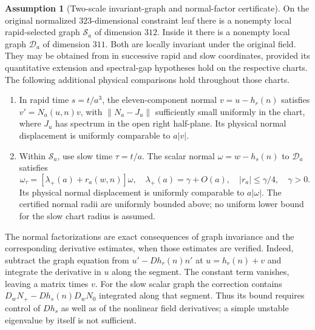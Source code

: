 \documentclass[11pt]{article}
\numberwithin{equation}{section}
\theoremstyle{definition}
\newtheorem{assumption}[assumption]{Assumption}
\theoremstyle{remark}
\begin{document}
\begin{assumption}[Two-scale invariant-graph and normal-factor certificate]
\label{ass:supp-exact-normal}
On the original normalized $323$-dimensional constraint leaf there is a
nonempty local rapid-selected graph $\mathcal S_a$ of dimension $312$.
Inside it there is a nonempty local graph $\mathcal D_a$ of dimension $311$.
Both are locally invariant under the original field. They may be obtained
from  in successive rapid and slow
coordinates, provided its quantitative extension and spectral-gap
hypotheses hold on the respective charts. The following additional
physical comparisons hold throughout those charts.
\begin{enumerate}[label=\textup{(N\arabic*)},leftmargin=3em]
\item In rapid time $s=t/a^3$, the eleven-component normal
$v=u-h_r(n)$ satisfies
$v'=N_a(u,n)v$, with $\|N_a-J_u\|$ sufficiently small uniformly in the
chart, where $J_u$ has spectrum in the open right half-plane. Its physical
normal displacement is uniformly comparable to $a|v|$.
\item Within $\mathcal S_a$, use slow time $\tau=t/a$. The scalar normal
$\omega=w-h_s(n)$ to $\mathcal D_a$ satisfies
\begin{equation}
 \omega_\tau=[\lambda_+(a)+r_a(w,n)]\omega,\quad
 \lambda_+(a)=\gamma+O(a),\quad |r_a|\le\gamma/4,\quad\gamma>0.
 \label{eq:supp-exact-slow-normal-factor}
\end{equation}
Its physical normal displacement is uniformly comparable to $a|\omega|$.
The certified normal radii are uniformly bounded above; no uniform lower
bound for the slow chart radius is assumed.
\end{enumerate}
\end{assumption}

The normal factorizations are exact consequences of graph invariance and
the corresponding derivative estimates, when those estimates are verified.
Indeed, subtract the graph equation from
$u'-Dh_r(n)n'$ at $u=h_r(n)+v$ and integrate the derivative in $u$
along the segment. The constant term vanishes, leaving a matrix times $v$.
For the slow scalar graph the correction contains
$D_wN_+-Dh_s(n)D_wN_0$ integrated along that segment. Thus its bound
requires control of $Dh_s$ as well as of the nonlinear field derivatives;
a simple unstable eigenvalue by itself is not sufficient.
\end{document}
